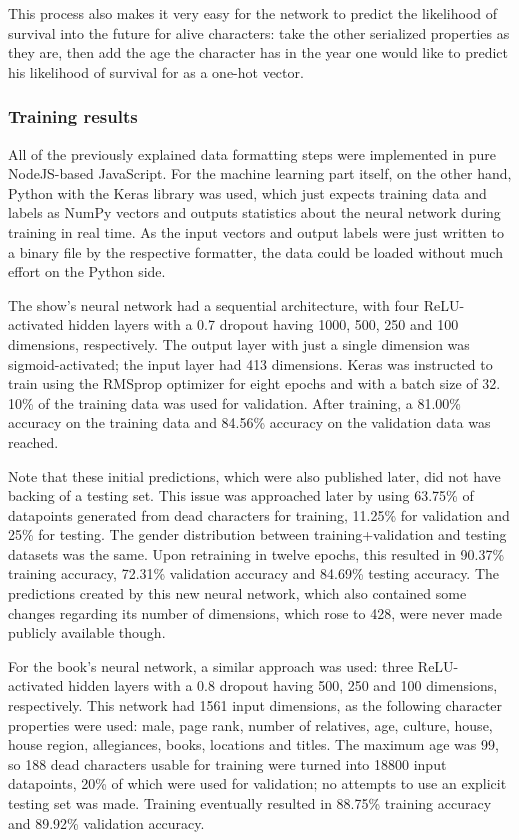 \documentclass{bioinfo}
\begin{document}
This process also makes it very easy for the network to predict the likelihood of survival into the future for alive characters: take the other serialized properties as they are, then add the age the character has in the year one would like to predict his likelihood of survival for as a one-hot vector.

\subsubsection{Training results}

All of the previously explained data formatting steps were implemented in pure NodeJS-based JavaScript. For the machine learning part itself, on the other hand, Python with the Keras library was used, which just expects training data and labels as NumPy vectors and outputs statistics about the neural network during training in real time. As the input vectors and output labels were just written to a binary file by the respective formatter, the data could be loaded without much effort on the Python side.

The show's neural network had a sequential architecture, with four ReLU-activated hidden layers with a 0.7 dropout having 1000, 500, 250 and 100 dimensions, respectively. The output layer with just a single dimension was sigmoid-activated; the input layer had 413 dimensions. Keras was instructed to train using the RMSprop optimizer for eight epochs and with a batch size of 32. 10\% of the training data was used for validation. After training, a 81.00\% accuracy on the training data and 84.56\% accuracy on the validation data was reached.

Note that these initial predictions, which were also published later, did not have backing of a testing set. This issue was approached later by using 63.75\% of datapoints generated from dead characters for training, 11.25\% for validation and 25\% for testing. The gender distribution between training+validation and testing datasets was the same. Upon retraining in twelve epochs, this resulted in 90.37\% training accuracy, 72.31\% validation accuracy and 84.69\% testing accuracy. The predictions created by this new neural network, which also contained some changes regarding its number of dimensions, which rose to 428, were never made publicly available though.

For the book's neural network, a similar approach was used: three ReLU-activated hidden layers with a 0.8 dropout having 500, 250 and 100 dimensions, respectively. This network had 1561 input dimensions, as the following character properties were used: male, page rank, number of relatives, age, culture, house, house region, allegiances, books, locations and titles. The maximum age was 99, so 188 dead characters usable for training were turned into 18800 input datapoints, 20\% of which were used for validation; no attempts to use an explicit testing set was made. Training eventually resulted in 88.75\% training accuracy and 89.92\% validation accuracy.
\end{document}
